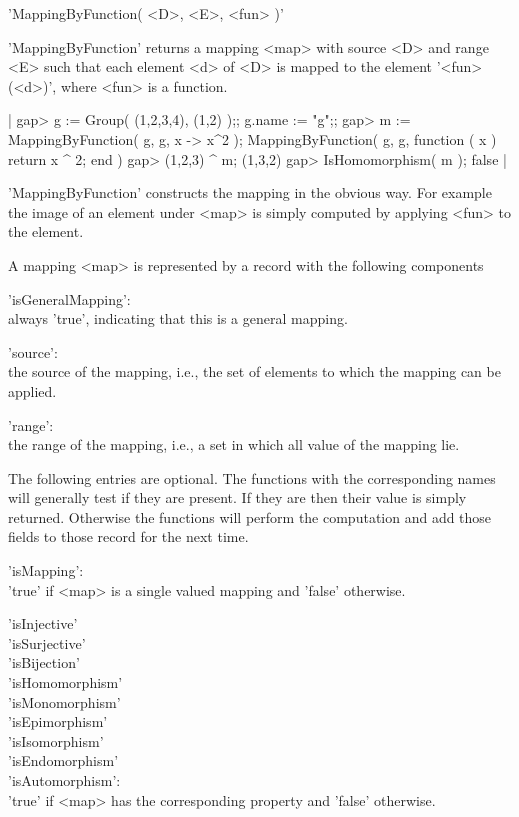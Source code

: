 
'MappingByFunction( <D>, <E>, <fun> )'

'MappingByFunction' returns a mapping <map> with source <D> and range <E>
such that each element <d> of <D> is mapped to the element  '<fun>(<d>)',
where <fun> is a {\GAP} function.

|    gap> g := Group( (1,2,3,4), (1,2) );;  g.name := "g";;
    gap> m := MappingByFunction( g, g, x -> x^2 );
    MappingByFunction( g, g, function ( x )
        return x ^ 2;
    end )
    gap> (1,2,3) ^ m;
    (1,3,2)
    gap> IsHomomorphism( m );
    false |

'MappingByFunction'  constructs  the mapping  in  the obvious  way.   For
example the  image of  an  element  under  <map> is  simply  computed  by
applying <fun> to the element.


A mapping <map> is represented by a record with the following components

'isGeneralMapping': \\
        always 'true', indicating that this is a general mapping.

'source': \\
        the  source of   the mapping,   i.e.,   the set  of   elements to
        which the mapping can be applied.

'range': \\
        the   range   of the mapping,  i.e.,  a  set in   which all value
        of the mapping lie.

The following entries are optional.  The functions with the corresponding
names will generally  test if they  are present.  If they are  then their
value  is  simply returned.   Otherwise the  functions  will  perform the
computation and add those fields to those record for the next time.

'isMapping': \\
        'true' if <map> is a single valued mapping and 'false' otherwise.

'isInjective' \\
'isSurjective' \\
'isBijection' \\
'isHomomorphism' \\
'isMonomorphism' \\
'isEpimorphism' \\
'isIsomorphism' \\
'isEndomorphism' \\
'isAutomorphism': \\
        'true' if  <map>  has  the  corresponding  property  and  'false'
        otherwise.

